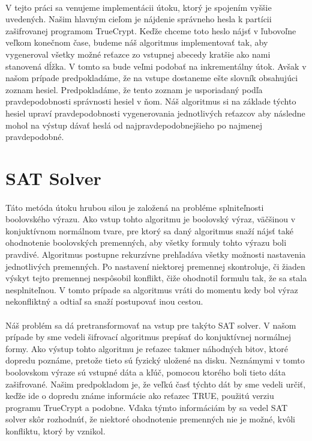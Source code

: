 \paragraph{}
V tejto práci sa venujeme implementácii útoku, ktorý je spojením vyššie uvedených. Našim hlavným cieľom je nájdenie správneho hesla k partícii zašifrovanej programom TrueCrypt. Keďže chceme toto heslo nájsť v ľubovoľne veľkom konečnom čase, budeme náš algoritmus implementovať tak, aby vygeneroval všetky možné reťazce zo vstupnej abecedy kratšie ako nami stanovená dĺžka. V tomto sa bude veľmi podobať na inkrementálny útok. Avšak v našom prípade predpokladáme, že na vstupe dostaneme ešte slovník obsahujúci zoznam hesiel. Predpokladáme, že tento zoznam je usporiadaný podľa pravdepodobnosti správnosti hesiel v ňom. Náš algoritmus si na základe týchto hesiel upraví pravdepodobnosti vygenerovania jednotlivých reťazcov aby následne mohol na výstup dávať heslá od najpravdepodobnejšieho po najmenej pravdepodobné. 

\section{SAT Solver}
\paragraph{}
Táto metóda útoku hrubou silou je založená na probléme splniteľnosti boolovského výrazu. Ako vstup tohto algoritmu je boolovský výraz, väčšinou v konjuktívnom normálnom tvare, pre ktorý sa daný algoritmus snaží nájsť také ohodnotenie boolovských premenných, aby všetky formuly tohto výrazu boli pravdivé. Algoritmus postupne rekurzívne prehľadáva všetky možnosti nastavenia jednotlivých premenných. Po nastavení niektorej premennej skontroluje, či žiaden výskyt tejto premennej nespôsobil konflikt, čiže ohodnotil formulu tak, že sa stala nesplniteľnou. V tomto prípade sa algoritmus vráti do momentu kedy bol výraz nekonfliktný a odtiaľ sa snaží postupovať inou cestou.

\paragraph{}
Náš problém sa dá pretransformovať na vstup pre takýto SAT solver. V našom prípade by sme vedeli šifrovací algoritmus prepísať do konjuktívnej normálnej formy. Ako výstup tohto algoritmu je reťazec takmer náhodných bitov, ktoré dopredu poznáme, pretože tieto sú fyzický uložené na disku. Neznámymi v tomto boolovskom výraze sú vstupné dáta a kľúč, pomocou ktorého boli tieto dáta zašifrované. Našim predpokladom je, že veľkú časť týchto dát by sme vedeli určiť, keďže ide o dopredu známe informácie ako reťazec TRUE, použitú verziu programu TrueCrypt a podobne. Vďaka týmto informáciám by sa vedel SAT solver skôr rozhodnúť, že niektoré ohodnotenie premenných nie je možné, kvôli konfliktu, ktorý by vznikol.

